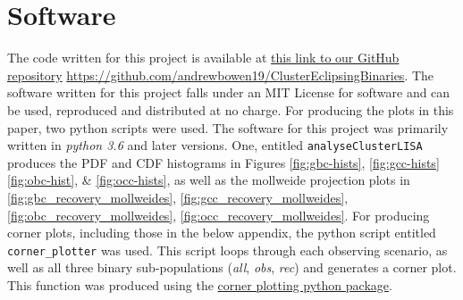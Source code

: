 \documentclass[twocolumn]{aastex63}
\begin{document}







\appendix


\section{Software}
\label{app:Appendix A}
The code written for this project is available at \href{https://github.com/andrewbowen19/ClusterEclipsingBinaries}{this link to our GitHub repository} \url{https://github.com/andrewbowen19/ClusterEclipsingBinaries}. The software written for this project falls under an MIT License for software and can be used, reproduced and distributed at no charge. For producing the plots in this paper, two python scripts were used. The software for this project was primarily written in \textit{python 3.6} and later versions. One, entitled \texttt{analyseClusterLISA} produces the PDF and CDF histograms in Figures \ref{fig:gbc-hists}, \ref{fig:gcc-hists} \ref{fig:obc-hist}, \& \ref{fig:occ-hists}, as well as the mollweide projection plots in \ref{fig:gbc_recovery_mollweides}, \ref{fig:gcc_recovery_mollweides}, \ref{fig:obc_recovery_mollweides}, \ref{fig:occ_recovery_mollweides}. For producing corner plots, including those in the below appendix, the python script entitled \texttt{corner\_plotter} was used. This script loops through each observing scenario, as well as all three binary sub-populations (\textit{all}, \textit{obs}, \textit{rec}) and generates a corner plot. This function was produced using the \href{https://corner.readthedocs.io/en/latest/}{corner plotting python package}.
\end{document}
